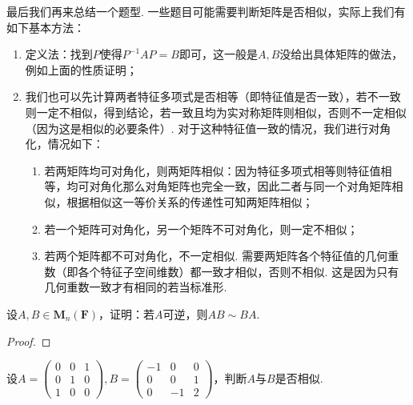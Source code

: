 最后我们再来总结一个题型. 一些题目可能需要判断矩阵是否相似，实际上我们有如下基本方法：
\begin{enumerate}
    \item 定义法：找到$P$使得$P^{-1}AP=B$即可，这一般是$A,B$没给出具体矩阵的做法，例如上面的性质证明；

    \item 我们也可以先计算两者特征多项式是否相等（即特征值是否一致），若不一致则一定不相似，得到结论，若一致且均为实对称矩阵则相似，否则不一定相似（因为这是相似的必要条件）. 对于这种特征值一致的情况，我们进行对角化，情况如下：
          \begin{enumerate}
              \item 若两矩阵均可对角化，则两矩阵相似：因为特征多项式相等则特征值相等，均可对角化那么对角矩阵也完全一致，因此二者与同一个对角矩阵相似，根据相似这一等价关系的传递性可知两矩阵相似；

              \item 若一个矩阵可对角化，另一个矩阵不可对角化，则一定不相似；

              \item 若两个矩阵都不可对角化，不一定相似. 需要两矩阵各个特征值的几何重数（即各个特征子空间维数）都一致才相似，否则不相似. 这是因为只有几何重数一致才有相同的若当标准形.
          \end{enumerate}
\end{enumerate}

\begin{example}
    设$A,B\in \mathbf{M}_n(\mathbf{F})$，证明：若$A$可逆，则$AB\sim BA$.
\end{example}

\begin{proof}

\end{proof}

\begin{example}
    设$A=\begin{pmatrix}
            0 & 0 & 1 \\ 0 & 1 & 0 \\ 1 & 0 & 0
        \end{pmatrix},B=\begin{pmatrix}
            -1 & 0 & 0 \\ 0 & 0 & 1 \\ 0 & -1 & 2
        \end{pmatrix}$，判断$A$与$B$是否相似.
\end{example}

\begin{solution}

\end{solution}

